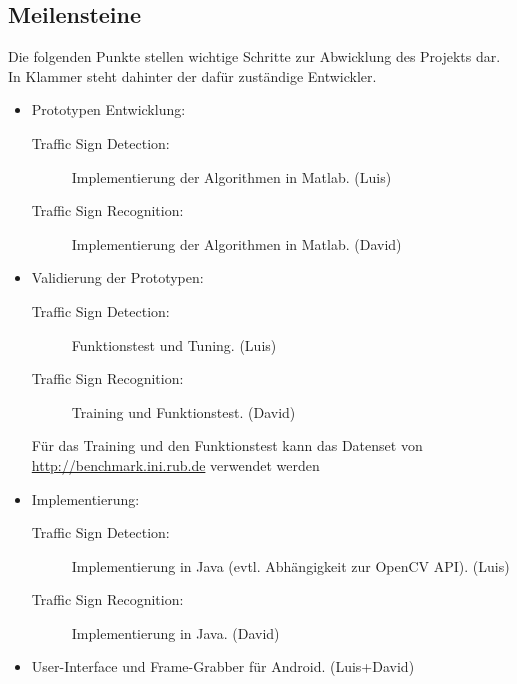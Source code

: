 \subsection*{Meilensteine}
    Die folgenden Punkte stellen wichtige Schritte zur Abwicklung des Projekts dar. In Klammer
    steht dahinter der dafür zuständige Entwickler.
	\begin{itemize}
        \item Prototypen Entwicklung:
        \begin{description}
            \item[Traffic Sign Detection:] Implementierung der Algorithmen in Matlab. \hfill (Luis)
            \item[Traffic Sign Recognition:] Implementierung der Algorithmen in Matlab. \hfill (David)
        \end{description}
        \item Validierung der Prototypen:
        \begin{description}
            \item[Traffic Sign Detection:] Funktionstest und Tuning. \hfill (Luis)
            \item[Traffic Sign Recognition:] Training und Funktionstest. \hfill (David)
        \end{description}
        Für das Training und den Funktionstest kann das Datenset von \url{http://benchmark.ini.rub.de} verwendet werden
	    \item Implementierung:
        \begin{description}
            \item[Traffic Sign Detection:] Implementierung in Java (evtl. Abhängigkeit zur OpenCV API). \hfill (Luis)
            \item[Traffic Sign Recognition:] Implementierung in Java. \hfill (David)
        \end{description}
        \item User-Interface und Frame-Grabber für Android. \hfill (Luis+David)
	\end{itemize}
